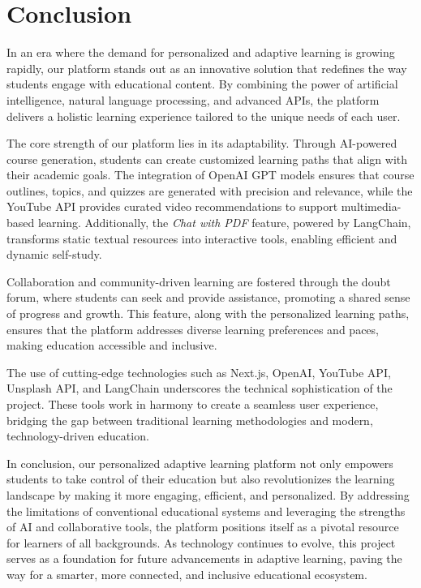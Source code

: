 
\chapter{Conclusion} %

\label{Chapter5} %

In an era where the demand for personalized and adaptive learning is growing rapidly, our platform stands out as an innovative solution that redefines the way students engage with educational content. By combining the power of artificial intelligence, natural language processing, and advanced APIs, the platform delivers a holistic learning experience tailored to the unique needs of each user.

The core strength of our platform lies in its adaptability. Through AI-powered course generation, students can create customized learning paths that align with their academic goals. The integration of OpenAI GPT models ensures that course outlines, topics, and quizzes are generated with precision and relevance, while the YouTube API provides curated video recommendations to support multimedia-based learning. Additionally, the \textit{Chat with PDF} feature, powered by LangChain, transforms static textual resources into interactive tools, enabling efficient and dynamic self-study.

Collaboration and community-driven learning are fostered through the doubt forum, where students can seek and provide assistance, promoting a shared sense of progress and growth. This feature, along with the personalized learning paths, ensures that the platform addresses diverse learning preferences and paces, making education accessible and inclusive.

The use of cutting-edge technologies such as Next.js, OpenAI, YouTube API, Unsplash API, and LangChain underscores the technical sophistication of the project. These tools work in harmony to create a seamless user experience, bridging the gap between traditional learning methodologies and modern, technology-driven education.

In conclusion, our personalized adaptive learning platform not only empowers students to take control of their education but also revolutionizes the learning landscape by making it more engaging, efficient, and personalized. By addressing the limitations of conventional educational systems and leveraging the strengths of AI and collaborative tools, the platform positions itself as a pivotal resource for learners of all backgrounds. As technology continues to evolve, this project serves as a foundation for future advancements in adaptive learning, paving the way for a smarter, more connected, and inclusive educational ecosystem.

